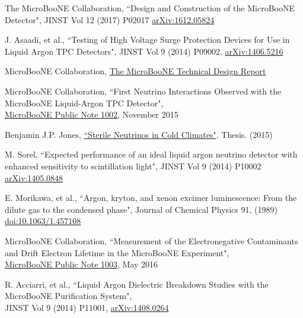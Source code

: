 \begin{thebibliography}{20}
  The MicroBooNE Collaboration, ``Design and Construction of the MicroBooNE Detector", JINST Vol 12 (2017) P02017 \href{https://arxiv.org/pdf/1612.05824v2.pdf}{arXiv:1612.05824}

  J. Asaadi, et al., ``Testing of High Voltage Surge Protection Devices for Use in Liquid Argon TPC Detectors", JINST Vol 9 (2014) P09002, \href{https://arxiv.org/pdf/1406.5216v2.pdf}{arXiv:1406.5216}

  MicroBooNE Collaboration,
  \href{http://microboone-docdb.fnal.gov/cgi-bin/RetrieveFile?docid=1821&filename=TDRCD3.pdf&version=13}{The MicroBooNE Technical Design Report}

  MicroBooNE Collaboration, ``First Neutrino Interactions Observed with the MicroBooNE Liquid-Argon TPC Detector",\\
 \href{http://microboone.fnal.gov/wp-content/uploads/MICROBOONE-NOTE-1002-PUB.pdf}{MicroBooNE Public Note 1002}, November 2015

  Benjamin J.P. Jones, \href{https://inspirehep.net/record/1389805/files/fermilab-thesis-2015-17.pdf}{``Sterile Neutrinos in Cold Climates"}. Thesis. (2015)

  M. Sorel, ``Expected performance of an ideal liquid argon neutrino detector with enhanced sensitivity to scintillation light", JINST Vol 9 (2014) P10002
  \href{https://arxiv.org/pdf/1405.0848.pdf}{arXiv:1405.0848}

  E. Morikawa, et al., ``Argon, kryton, and xenon excimer luminescence: From the dilute gas to the condensed phase", Journal of Chemical Physics 91, (1989) \\
  \href{http://aip.scitation.org/doi/pdf/10.1063/1.457108}{doi:10.1063/1.457108}
  
  MicroBooNE Collaboration, ``Measurement of the Electronegative Contaminants and Drift Electron Lifetime in the MicroBooNE Experiment",\\
 \href{http://microboone.fnal.gov/wp-content/uploads/MICROBOONE-NOTE-1003-PUB.pdf}{MicroBooNE Public Note 1003}, May 2016 

  R. Acciarri, et al., ``Liquid Argon Dielectric Breakdown Studies with the MicroBooNE Purification System", \\
  JINST Vol 9 (2014) P11001, \href{https://arxiv.org/pdf/1408.0264v1.pdf}{arXiv:1408.0264}
  

\end{thebibliography}
